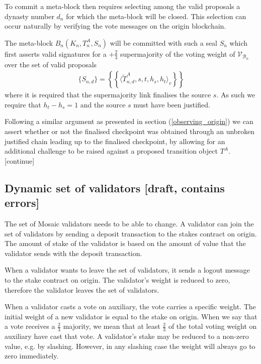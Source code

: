 \documentclass[12pt,a4paper]{article}
\begin{document}
To commit a meta-block then requires selecting among the valid proposals a dynasty number $d_n$ for which the meta-block will be closed. This selection can occur naturally by verifying the vote messages on the origin blockchain.

The meta-block $B_n(K_n, T^A_n, S_n)$ will be committed with such a seal $S_n$ which first asserts valid signatures for a $+\tfrac{2}{3}$ supermajority of the voting weight  of $\mathcal{V}_{\mathcal{B}_n}$ over the set of valid proposals
\begin{align*}
  \{S_{n,d}\} = \left\{\left\{\langle\tilde{T}^A_{n,d}, s, t, h_s, h_t\rangle_v\right\}\right\}
\end{align*}
where it is required that the supermajority link finalises the source $s$.  As such we require that $h_t - h_s = 1$ and the source $s$ must have been justified.  

Following a similar argument as presented in section (\ref{observing_origin}) we can assert whether or not the finalised checkpoint was obtained through an unbroken justified chain leading up to the finalised checkpoint, by allowing for an additional challenge to be raised against a proposed transition object $T^A$. [continue] %

\subsection{Dynamic set of validators [draft, contains errors]}

The set of Mosaic validators needs to be able to change.
A validator can join the set of validators by sending a deposit transaction to the stakes contract on origin.
The amount of stake of the validator is based on the amount of value that the validator sends with the deposit transaction.

When a validator wants to leave the set of validators, it sends a logout message to the stake contract on origin.
The validator's weight is reduced to zero, therefore the validator leaves the set of validators.

When a validator casts a vote on auxiliary, the vote carries a specific weight.
The initial weight of a new validator is equal to the stake on origin.
When we say that a vote receives a $\frac{2}{3}$ majority, we mean that at least $\frac{2}{3}$ of the total voting weight on auxiliary have cast that vote.
A validator's stake may be reduced to a non-zero value, e.g. by slashing.
However, in any slashing case the weight will always go to zero immediately.
\end{document}
